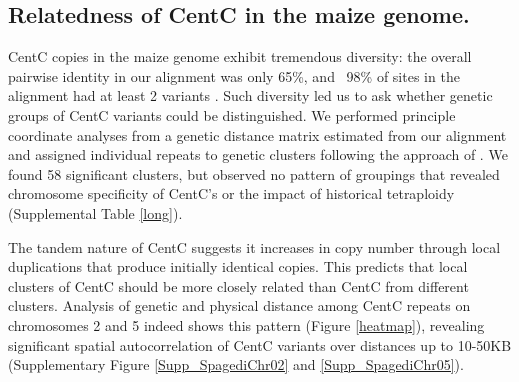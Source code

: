 {\subsection*{Relatedness of CentC in the maize genome.}

CentC copies in the maize genome exhibit tremendous diversity: the overall pairwise identity in our alignment was only 65\%, and ~98\% of sites in the alignment had at least 2 variants .  Such diversity led us to ask whether genetic groups of CentC variants could be distinguished. We performed principle coordinate analyses from a genetic distance matrix estimated from our alignment and assigned individual repeats to  genetic clusters following the approach of \citet{Patterson2006}.  We found 58 significant clusters, but observed no pattern of groupings that revealed chromosome specificity of CentC’s or the impact of historical tetraploidy (Supplemental Table \ref{long}).

The tandem nature of CentC suggests it increases in copy number through local duplications that produce initially identical copies.  This predicts that local clusters of CentC should be more closely related than CentC from different clusters.  Analysis of genetic and physical distance among CentC repeats on chromosomes 2 and 5 indeed shows this pattern (Figure \ref{heatmap}), revealing significant spatial autocorrelation of CentC variants over distances up to 10-50KB (Supplementary Figure \ref{Supp_SpagediChr02} and \ref{Supp_SpagediChr05}).

}
